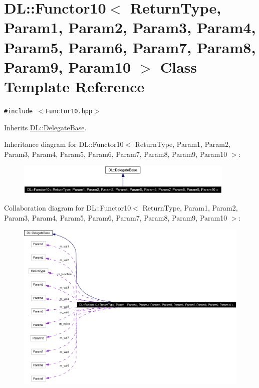 \hypertarget{classDL_1_1Functor10}{
\section{DL::Functor10$<$ Return\-Type, Param1, Param2, Param3, Param4, Param5, Param6, Param7, Param8, Param9, Param10 $>$ Class Template Reference}
\label{classDL_1_1Functor10}
}
{\tt \#include $<$Functor10.hpp$>$}

Inherits \hyperlink{classDL_1_1DelegateBase}{DL::Delegate\-Base}.

Inheritance diagram for DL::Functor10$<$ Return\-Type, Param1, Param2, Param3, Param4, Param5, Param6, Param7, Param8, Param9, Param10 $>$:\begin{figure}[H]
\begin{center}
\leavevmode
\includegraphics[width=296pt]{classDL_1_1Functor10__inherit__graph}
\end{center}
\end{figure}
Collaboration diagram for DL::Functor10$<$ Return\-Type, Param1, Param2, Param3, Param4, Param5, Param6, Param7, Param8, Param9, Param10 $>$:\begin{figure}[H]
\begin{center}
\leavevmode
\includegraphics[width=388pt]{classDL_1_1Functor10__coll__graph}
\end{center}
\end{figure}
